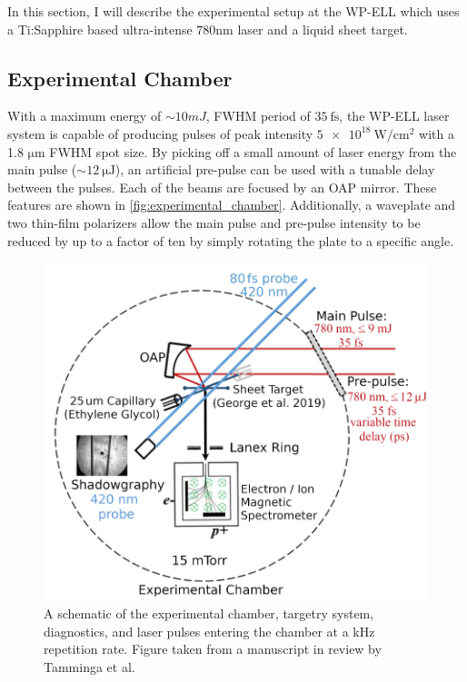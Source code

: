 In this section, I will describe the experimental setup at the \gls{WP-ELL} which uses a Ti:Sapphire based ultra-intense $780 \unit{\nano \meter}$ laser and a liquid sheet target.  

\subsection{Experimental Chamber}

With a maximum energy of $\sim 10 \unit{mJ}$, \gls{FWHM} period of $\SI{35}{\femto \second}$, the \gls{WP-ELL} laser system is capable of producing pulses of peak intensity $\SI{5e18}{\watt \per \centi \meter \squared}$ with a 1.8 $\unit{\micro \meter}$ \gls{FWHM} spot size. By picking off a small amount of laser energy from the main pulse ($\sim \SI{12}{\micro \joule}$), an artificial pre-pulse can be used with a tunable delay between the pulses. Each of the beams are focused by an \gls{OAP} mirror. These features are shown in \autoref{fig:experimental_chamber}. Additionally, a waveplate and two thin-film polarizers allow the main pulse and pre-pulse intensity to be reduced by up to a factor of ten by simply rotating the plate to a specific angle.

\begin{figure}
	\centering 
	\includegraphics[width=0.75\linewidth]{planning/images/daq/experimental_chamber.PNG}
	\caption{A schematic of the experimental chamber, targetry system, diagnostics, and laser pulses entering the chamber at a kHz repetition rate. Figure taken from a manuscript in review by Tamminga et al.}
	\label{fig:experimental_chamber}
\end{figure}

